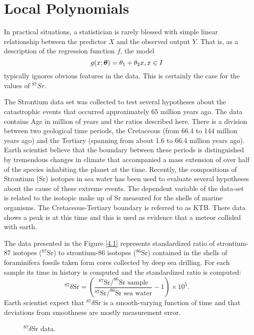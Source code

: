 \section{Local Polynomials}
In practical situations, a statistician is rarely blessed with simple
linear relationship between the predictor $X$ and the observed output
$Y$. That is, as a description of the regression function $f$, the
model 
\[
g(x;\mbox{\boldmath $\theta$\unboldmath}) = \theta_1 + \theta_2 x, x \in I
\]
typically ignores obvious features in the data. This is certainly the
case for the values of $^{87} Sr$. 

The Strontium data set was collected to test several hypotheses 
about the catastrophic events that occurred approximately 65 million
years ago. The data contains Age in million of years and the ratios
described here. There is a division between
two geological time periods, the Cretaceous (from 66.4 to 144 million
years ago) and the 
Tertiary (spanning from about 1.6 to 66.4 million years ago). Earth
scientist believe that the boundary between these periods is
distinguished by tremendous changes in climate that accompanied a mass
extension of over half of the species inhabiting the planet at the
time. Recently, the compositions of Strontium (Sr) isotopes in sea
water has been used to evaluate several hypotheses about the cause of
these extreme events. The dependent variable of the data-set is related to
the isotopic make up of Sr measured for the shells of marine
organisms. The Cretaceous-Tertiary boundary is referred to as
KTB. There data shows a 
peak is at this time and this is used as 
evidence that a meteor collided with earth. 

The data presented in the Figure \ref{4.1} represents standardized ratio of
strontium-87 isotopes ($^{87}$Sr) to strontium-86 isotopes ($^{86}$Sr)
contained in the shells of foraminifera fossils taken form cores
collected by deep sea drilling. For each sample its time in history is
computed and  the standardized ratio is computed:
\[
^{87}\delta \mbox{Sr} = \left( \frac{ ^{87}\mbox{Sr}/^{86}\mbox{Sr sample}}{^{87}\mbox{Sr}/^{86}\mbox{Sr sea
    water}} - 1\right) \times 10^5.
\] 
Earth scientist expect that $^{87}\delta \mbox{Sr}$ is a smooth-varying
function of time and that deviations from smoothness are  mostly
measurement error. 


\begin{figure}[h]
\centerline{}
\caption{\label{f4.1}  $^{87}\delta \mbox{Sr}$ data.}
\end{figure}

